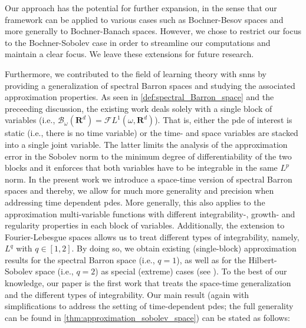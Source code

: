 \documentclass[a4paper]{article}
\newcommand{\rr}[1]{\mathbf{R}^{#1}}
\numberwithin{equation}{section}
\theoremstyle{remark}
\begin{document}
Our approach has the potential for further expansion,
in the sense that our framework can be applied to various cases
such as Bochner-Besov spaces and more generally to Bochner-Banach spaces.
However, we chose to restrict our focus to the Bochner-Sobolev
case in order to streamline our computations and maintain a clear focus.
We leave these extensions for future research.


Furthermore, we contributed to the field of learning theory with \glspl{snn}
by providing a generalization of spectral Barron spaces
and studying the associated approximation properties.
As seen in \cref{def:spectral_Barron_space} and the preceeding discussion,
the existing work deals solely with a single block of variables
(i.e., $\mathscr{B}_\omega(\rr{d}) = \mathscr{F}L^1(\omega, \rr{d})$).
That is, either the \gls{pde} of interest is static (i.e., there is no time variable)
or the time- and space variables are stacked into a single joint variable.
The latter limits the analysis of the approximation error in the Sobolev norm
to the minimum degree of differentiability of the two blocks
and it enforces that both variables have to be integrable in the same $L^p$ norm.
In the present work we introduce a space-time
version of spectral Barron spaces and thereby,
we allow for much more
generality and precision when addressing
time dependent \glspl{pde}.
More generally, this also applies to the approximation
multi-variable functions with different
integrability-, growth- and regularity properties in each block of variables.
Additionally, the extension to Fourier-Lebesgue spaces
allows us to treat different types of integrability, namely, $L^q$ with $q\in [1,2]$.
By doing so, we obtain existing (single-block) approximation results
for the spectral Barron space (i.e., $q=1$),
as well as for the Hilbert-Sobolev space (i.e., $q=2$) as special (extreme) cases
(see \cite{Barron93UniversalApproximationBounds,Siegel20ApproximationRatesNeural}).
To the best of our knowledge, our paper is the first
work that treats the space-time generalization and the different types of integrability.
Our main result (again with simplifications to address the setting of time-dependent \glspl{pde}; the full generality can be found in \cref{thm:approximation_sobolev_space})
can be stated as follows:
\end{document}
